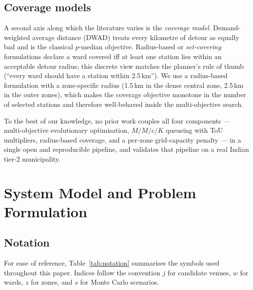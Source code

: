 \documentclass[conference]{IEEEtran}
\begin{document}
\subsection{Coverage models}
A second axis along which the literature varies is the
\emph{coverage model}. Demand-weighted average distance (DWAD)
treats every kilometre of detour as equally bad and is the
classical $p$-median objective. Radius-based or
\emph{set-covering} formulations declare a ward covered iff at
least one station lies within an acceptable detour radius; this
discrete view matches the planner's rule of thumb (``every ward
should have a station within 2.5\,km''). We use a radius-based
formulation with a zone-specific radius (1.5\,km in the dense
central zone, 2.5\,km in the outer zones), which makes the
coverage objective monotone in the number of selected stations and
therefore well-behaved inside the multi-objective search.

\medskip
To the best of our knowledge, no prior work couples all four
components --- multi-objective evolutionary optimisation,
$M/M/c/K$ queueing with ToU multipliers, radius-based coverage,
and a per-zone grid-capacity penalty --- in a single open and
reproducible pipeline, and validates that pipeline on a real
Indian tier-2 municipality.

\section{System Model and Problem Formulation}
\label{sec:model}

\subsection{Notation}
\label{subsec:notation}
For ease of reference, Table~\ref{tab:notation} summarises the
symbols used throughout this paper. Indices follow the convention
$j$ for candidate venues, $w$ for wards, $z$ for zones, and $s$ for
Monte Carlo scenarios.
\end{document}
